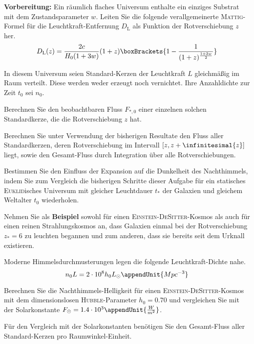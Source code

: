 \documentclass{atistandalonetask}
\begin{document}
  \begin{atiTask}[
    title = Das \textsc{Olbers}-Paradoxon
  ]
    \begin{atiSubtasks}
      \item{ 
        \textbf{Vorbereitung:}
        Ein räumlich flaches Universum enthalte ein einziges Substrat mit dem Zustandsparameter $w$.
        Leiten Sie die folgende verallgemeinerte \textsc{Mattig}-Formel für die Leuchtkraft-Entfernung $D_\mathrm{L}$ als Funktion der Rotverschiebung $z$ her.
        \[
          D_\mathrm{L}(z) = \frac{2c}{H_0(1+3w)}(1+z)\boxBrackets{1 - \frac{1}{(1+z)^{\frac{1+3w}{2}}}}
        \]
      }
      \item{
        In diesem Universum seien Standard-Kerzen der Leuchtkraft $L$ gleichmäßig im Raum verteilt.
        Diese werden weder erzeugt noch vernichtet.
        Ihre Anzahldichte zur Zeit $t_0$ sei $n_0$.

        Berechnen Sie den beobachtbaren Fluss $F_{*,0}$ einer einzelnen solchen Standardkerze, die die Rotverschiebung $z$ hat.
      }
      \item{
        Berechnen Sie unter Verwendung der bisherigen Resultate den Fluss aller Standardkerzen, deren Rotverschiebung im Intervall $[z,z+\infinitesimal{z}]$ liegt, sowie den Gesamt-Fluss durch Integration über alle Rotverschiebungen.
      }
      \item{
        Bestimmen Sie den Einfluss der Expansion auf die Dunkelheit des Nachthimmels, indem Sie zum Vergleich die bisherigen Schritte dieser Aufgabe für ein statisches \textsc{Euklid}isches Universum mit gleicher Leuchtdauer $t_*$ der Galaxien und gleichem Weltalter $t_0$ wiederholen.

        Nehmen Sie als \textbf{Beispiel} sowohl für einen \textsc{Einstein-DeSitter}-Kosmos als auch für einen reinen Strahlungskosmos an, dass Galaxien einmal bei der Rotverschiebung $z_* = 6$ zu leuchten begannen und zum anderen, dass sie bereits seit dem Urknall existieren.
      }
      \item{
        Moderne Himmelsdurchmusterungen legen die folgende Leuchtkraft-Dichte nahe.
        \[
          n_0L = 2\cdot 10^8 h_0 L_\odot \appendUnit{Mpc^{-3}}
        \]

        Berechnen Sie die Nachthimmels-Helligkeit für einen \textsc{Einstein-DeSitter}-Kosmos mit dem dimensionslosen \textsc{Hubble}-Parameter $h_0=0.70$ und vergleichen Sie mit der Solarkonstante $F_\odot = 1.4\cdot 10^3 \appendUnit{\frac{W}{m^2}}$.

        \begin{atiNote}
          Für den Vergleich mit der Solarkonstanten benötigen Sie den Gesamt-Fluss aller Standard-Kerzen pro Raumwinkel-Einheit.
        \end{atiNote}
      }
    \end{atiSubtasks}
  \end{atiTask}
\end{document}
